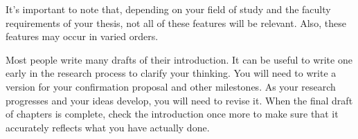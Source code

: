 It’s important to note that, depending on your field of study and the faculty
requirements of your thesis, not all of these features will be relevant. Also,
these features may occur in varied orders.

Most people write many drafts of their introduction. It can be useful to write
one early in the research process to clarify your thinking. You will need to
write a version for your confirmation proposal and other milestones. As your
research progresses and your ideas develop, you will need to revise it. When
the final draft of chapters is complete, check the introduction once more to
make sure that it accurately reflects what you have actually done.
